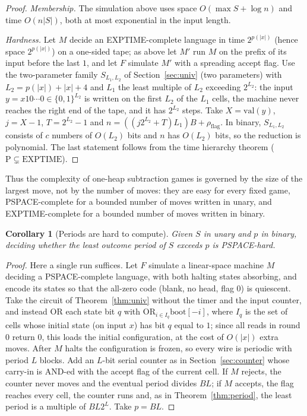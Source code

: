 \documentclass[11pt]{article}
\newtheorem{corollary}[theorem]{Corollary}
\theoremstyle{definition}
\begin{document}
\begin{proof}
\emph{Membership.}  The simulation above uses space $O(\max S+\log n)$ and time $O(n|S|)$, both at
most exponential in the input length.

\emph{Hardness.}  Let $M$ decide an EXPTIME-complete language in time $2^{p(|x|)}$ (hence space
$2^{p(|x|)}$) on a one-sided tape; as above let $M'$ run $M$ on the prefix of its input before the last
$1$, and let $F$ simulate $M'$ with a spreading accept flag.  Use the two-parameter family
$S_{L_1,L_2}$ of Section~\ref{sec:univ} (two parameters) with $L_2=p(|x|)+|x|+4$ and $L_1$ the least multiple of $L_2$
exceeding $2^{L_2}$: the input $y=x10\cdots0\in\{0,1\}^{L_2}$ is written on the first $L_2$ of the $L_1$
cells, the machine never reaches the right end of the tape, and it has $2^{L_2}$ steps.  Take
$X=\mathrm{val}(y)$, $j=X-1$, $T=2^{L_2}-1$ and $n=((j2^{L_2}+T)L_1)B+\rho_{\mathrm{flag}}$.  In binary,
$S_{L_1,L_2}$ consists of $c$ numbers of $O(L_2)$ bits and $n$ has $O(L_2)$ bits, so the reduction is
polynomial.  The last statement follows from the time hierarchy theorem
($\mathrm{P}\subsetneq\mathrm{EXPTIME}$).
\end{proof}

Thus the complexity of one-heap subtraction games is governed by the size of the largest move, not
by the number of moves: they are easy for every fixed game, PSPACE-complete for a bounded number of
moves written in unary, and EXPTIME-complete for a bounded number of moves written in binary.

\begin{corollary}[Periods are hard to compute]\label{cor:perhard}
Given $S$ in unary and $p$ in binary, deciding whether the least outcome period of $S$ exceeds $p$
is PSPACE-hard.
\end{corollary}

\begin{proof}
Here a single run suffices.  Let $F$ simulate a linear-space machine $M$ deciding a PSPACE-complete
language, with both halting states absorbing, and encode its states so that the all-zero code
(blank, no head, flag $0$) is quiescent.  Take the circuit of Theorem~\ref{thm:univ} without the timer
and the input counter, and instead OR each state bit $q$ with $\mathrm{OR}_{i\in I_q}\mathrm{boot}[-i]$,
where $I_q$ is the set of cells whose initial state (on input $x$) has bit $q$ equal to $1$; since all
reads in round $0$ return $0$, this loads the initial configuration, at the cost of $O(|x|)$ extra
moves.  After $M$ halts the configuration is frozen, so every wire is periodic with period $L$ blocks.
Add an $L$-bit serial counter as in Section~\ref{sec:counter} whose carry-in is AND-ed with the accept
flag of the current cell.  If $M$ rejects, the counter never moves and the eventual period divides
$BL$; if $M$ accepts, the flag reaches every cell, the counter runs and, as in
Theorem~\ref{thm:period}, the least period is a multiple of $BL2^L$.  Take $p=BL$.
\end{proof}
\end{document}
